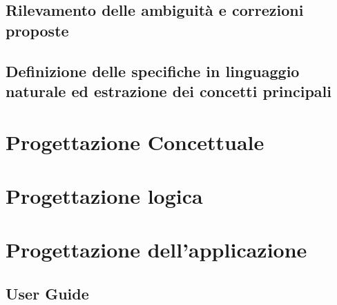 \documentclass{article}
\begin{document}
\subsection{Rilevamento delle ambiguità e correzioni proposte}
\newpage
\subsection{Definizione delle specifiche in linguaggio naturale ed estrazione dei concetti principali}

\newpage
\section{Progettazione Concettuale}

\newpage
\section{Progettazione logica}

\newpage
\section{Progettazione dell'applicazione}
\subsection{User Guide}
\end{document}
